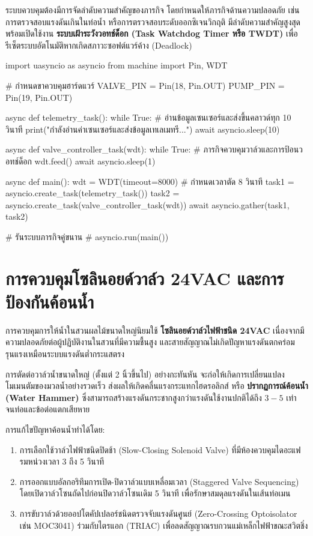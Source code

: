 ระบบควบคุมต้องมีการจัดลำดับความสำคัญของภารกิจ โดยกำหนดให้ภารกิจด้านความปลอดภัย เช่น การตรวจสอบแรงดันเกินในท่อน้ำ หรือการตรวจสอบระดับออกซิเจนวิกฤติ มีลำดับความสำคัญสูงสุด พร้อมเปิดใช้งาน \textbf{ระบบเฝ้าระวังวอทช์ด็อก (Task Watchdog Timer หรือ TWDT)} เพื่อรีเซ็ตระบบอัตโนมัติหากเกิดสภาวะซอฟต์แวร์ค้าง (Deadlock)

\begin{pythonbox}
import uasyncio as asyncio
from machine import Pin, WDT

# กำหนดขาควบคุมฮาร์ดแวร์
VALVE_PIN = Pin(18, Pin.OUT)
PUMP_PIN = Pin(19, Pin.OUT)

async def telemetry_task():
    while True:
        # อ่านข้อมูลเซนเซอร์และส่งขึ้นคลาวด์ทุก 10 วินาที
        print("กำลังอ่านค่าเซนเซอร์และส่งข้อมูลเทเลเมทรี...")
        await asyncio.sleep(10)

async def valve_controller_task(wdt):
    while True:
        # ภารกิจควบคุมวาล์วและการป้อนวอทช์ด็อก
        wdt.feed()
        await asyncio.sleep(1)

async def main():
    wdt = WDT(timeout=8000) # กำหนดเวลาตัด 8 วินาที
    task1 = asyncio.create_task(telemetry_task())
    task2 = asyncio.create_task(valve_controller_task(wdt))
    await asyncio.gather(task1, task2)

# รันระบบภารกิจคู่ขนาน
# asyncio.run(main())
\end{pythonbox}

\section{การควบคุมโซลินอยด์วาล์ว 24VAC และการป้องกันค้อนน้ำ}

การควบคุมการให้น้ำในสวนผลไม้ขนาดใหญ่นิยมใช้ \textbf{โซลินอยด์วาล์วไฟฟ้าชนิด 24VAC} เนื่องจากมีความปลอดภัยต่อผู้ปฏิบัติงานในสวนที่มีความชื้นสูง และสายสัญญาณไม่เกิดปัญหาแรงดันตกคร่อมรุนแรงเหมือนระบบแรงดันต่ำกระแสตรง

การตัดต่อวาล์วน้ำขนาดใหญ่ (ตั้งแต่ 2 นิ้วขึ้นไป) อย่างกะทันหัน จะก่อให้เกิดการเปลี่ยนแปลงโมเมนตัมของมวลน้ำอย่างรวดเร็ว ส่งผลให้เกิดคลื่นแรงกระแทกไฮดรอลิกส์ หรือ \textbf{ปรากฏการณ์ค้อนน้ำ (Water Hammer)} ซึ่งสามารถสร้างแรงดันกระชากสูงกว่าแรงดันใช้งานปกติได้ถึง $3 - 5$ เท่า จนท่อและข้อต่อแตกเสียหาย

\begin{theorybox}
การแก้ไขปัญหาค้อนน้ำทำได้โดย:
\begin{enumerate}[leftmargin=1.5em]
    \item การเลือกใช้วาล์วไฟฟ้าชนิดปิดช้า (Slow-Closing Solenoid Valve) ที่มีห้องควบคุมไดอะแฟรมหน่วงเวลา 3 ถึง 5 วินาที
    \item การออกแบบอัลกอริทึมการเปิด-ปิดวาล์วแบบเหลื่อมเวลา (Staggered Valve Sequencing) โดยเปิดวาล์วโซนถัดไปก่อนปิดวาล์วโซนเดิม 5 วินาที เพื่อรักษาสมดุลแรงดันในเส้นท่อเมน
    \item การขับวาล์วด้วยออปโตคัปเปลอร์ชนิดตรวจจับแรงดันศูนย์ (Zero-Crossing Optoisolator เช่น MOC3041) ร่วมกับไตรแอก (TRIAC) เพื่อลดสัญญาณรบกวนแม่เหล็กไฟฟ้าขณะสวิตชิ่ง
\end{enumerate}
\end{theorybox}

